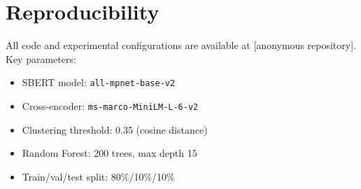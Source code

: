 \documentclass[11pt]{article}
\begin{document}
\section{Reproducibility}

All code and experimental configurations are available at [anonymous repository]. Key parameters:
\begin{itemize}
    \item SBERT model: \texttt{all-mpnet-base-v2}
    \item Cross-encoder: \texttt{ms-marco-MiniLM-L-6-v2}
    \item Clustering threshold: 0.35 (cosine distance)
    \item Random Forest: 200 trees, max depth 15
    \item Train/val/test split: 80\%/10\%/10\%
\end{itemize}



\end{document}
